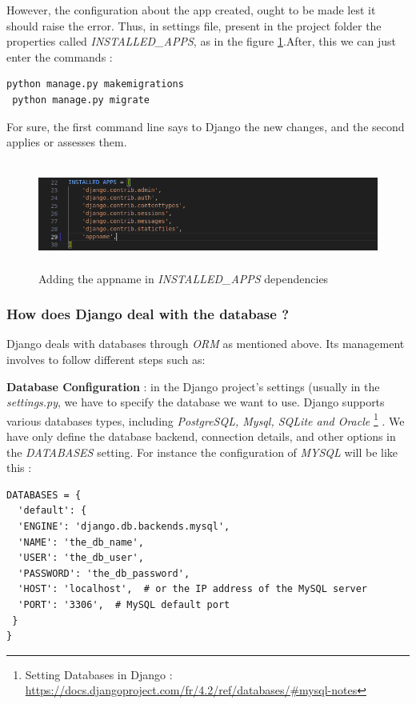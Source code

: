 \documentclass[12pt,a4paper, oneside]{book}
\begin{document}
  However, the configuration about the app created, ought to be made lest it should raise the error. Thus, in settings file, present in the project folder the properties called \textit{INSTALLED\_APPS}, as in the figure \ref{fig:appinstallname}.\newline After, this we can just enter the commands : 
 \begin{lstlisting}[style=stylejupyter]
 python manage.py makemigrations
 python manage.py migrate
\end{lstlisting}
For sure, the first command line says to Django the new changes, and the second applies or assesses them. 
\begin{figure}
	\centering
	\includegraphics[width=1\linewidth, height=3.5cm]{appInstallName}
	\caption{Adding the appname in \textit{INSTALLED\_APPS} dependencies }
	\label{fig:appinstallname}
\end{figure} 

\subsubsection*{How does Django deal with the database ?} 
Django deals with databases through \textit{ORM} as mentioned above. Its management involves to follow different steps such as:

\textbf{Database Configuration } : in the Django project's settings (usually in the \textit{settings.py}, we have to specify the database we want to use. Django supports various databases types, including \textit{PostgreSQL, Mysql, SQLite and Oracle} \footnote{Setting Databases in Django : \url{https://docs.djangoproject.com/fr/4.2/ref/databases/\#mysql-notes}}  . We have only define the database backend, connection details, and other options in the \textit{DATABASES} setting. For instance the configuration of \textit{MYSQL} will be like this : 
\begin{lstlisting}[style=stylejupyter]
DATABASES = {
  'default': {
  'ENGINE': 'django.db.backends.mysql',
  'NAME': 'the_db_name',
  'USER': 'the_db_user',
  'PASSWORD': 'the_db_password',
  'HOST': 'localhost',  # or the IP address of the MySQL server
  'PORT': '3306',  # MySQL default port
 }
}
\end{lstlisting} 
\end{document}
